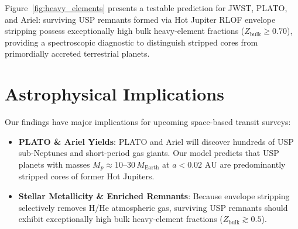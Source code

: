 \documentclass[twocolumn,10pt]{article}
\begin{document}
Figure~\ref{fig:heavy_elements} presents a testable prediction for JWST, PLATO, and Ariel: surviving USP remnants formed via Hot Jupiter RLOF envelope stripping possess exceptionally high bulk heavy-element fractions ($Z_{\text{bulk}} \ge 0.70$), providing a spectroscopic diagnostic to distinguish stripped cores from primordially accreted terrestrial planets.

\section{Astrophysical Implications}
Our findings have major implications for upcoming space-based transit surveys:
\begin{itemize}
    \item \textbf{PLATO \& Ariel Yields}: PLATO and Ariel will discover hundreds of USP sub-Neptunes and short-period gas giants. Our model predicts that USP planets with masses $M_p \approx 10\text{--}30\,M_{\text{Earth}}$ at $a < 0.02\text{ AU}$ are predominantly stripped cores of former Hot Jupiters.
    \item \textbf{Stellar Metallicity \& Enriched Remnants}: Because envelope stripping selectively removes H/He atmospheric gas, surviving USP remnants should exhibit exceptionally high bulk heavy-element fractions ($Z_{\text{bulk}} \gtrsim 0.5$).
\end{itemize}
\end{document}
